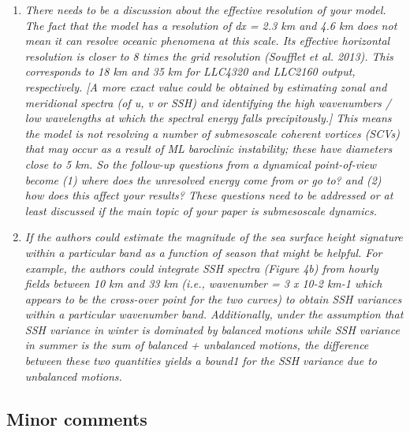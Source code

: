 \documentclass[11pt]{article}
\begin{document}
\begin{enumerate}
  \item {\it There needs to be a discussion about the effective resolution of your model. The fact that
        the model has a resolution of dx = 2.3 km and 4.6 km does not mean it can resolve oceanic
        phenomena at this scale. Its effective horizontal resolution is closer to 8 times the grid
        resolution (Soufflet et al. 2013). This corresponds to 18 km and 35 km for LLC4320 and
        LLC2160 output, respectively. [A more exact value could be obtained by estimating zonal
        and meridional spectra (of u, v or SSH) and identifying the high wavenumbers / low
        wavelengths at which the spectral energy falls precipitously.] This means the model is not
        resolving a number of submesoscale coherent vortices (SCVs) that may occur as a result of
        ML baroclinic instability; these have diameters close to 5 km. So the follow-up questions
        from a dynamical point-of-view become (1) where does the unresolved energy come from or
        go to? and (2) how does this affect your results? These questions need to be addressed or at
        least discussed if the main topic of your paper is submesoscale dynamics.}

 \item {\it If the authors could estimate the magnitude of the sea surface height signature within a
        particular band as a function of season that might be helpful. For example, the authors could
        integrate SSH spectra (Figure 4b) from hourly fields between 10 km and 33 km (i.e.,
        wavenumber = 3 x 10-2 km-1 which appears to be the cross-over point for the two curves) to
        obtain SSH variances within a particular wavenumber band. Additionally, under the
        assumption that SSH variance in winter is dominated by balanced motions while SSH
        variance in summer is the sum of balanced + unbalanced motions, the difference between
        these two quantities yields a bound1 for the SSH variance due to unbalanced motions.}

\end{enumerate}

\subsection{Minor comments}
\end{document}
